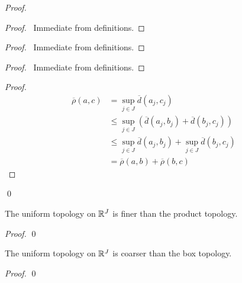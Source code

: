 \begin{proof}
    \pf
    \begin{proof}
        \pf\ Immediate from definitions.
    \end{proof}
    \begin{proof}
        \pf\ Immediate from definitions.
    \end{proof}
    \begin{proof}
        \pf\ Immediate from definitions.
    \end{proof}
    \begin{proof}
        \pf
        \begin{align*}
            \overline{\rho}(a,c) & = \sup_{j \in J} \overline{d}(a_j, c_j) \\
            & \leq \sup_{j \in J} (\overline{d}(a_j, b_j) + \overline{d}(b_j, c_j)) \\ 
            & \leq \sup_{j \in J} \overline{d}(a_j, b_j) + \sup_{j \in J} \overline{d}(b_j, c_j) \\
            & = \overline{\rho}(a,b) + \overline{\rho}(b,c)
        \end{align*}
    \end{proof}
    \qed
\end{proof}

\begin{proposition}
    The uniform topology on $\mathbb{R}^J$ is finer than the product topology.
\end{proposition}

\begin{proof}
    \pf
    \qed
\end{proof}

\begin{proposition}
    The uniform topology on $\mathbb{R}^J$ is coarser than the box topology.
\end{proposition}

\begin{proof}
    \pf
    \qed
\end{proof}

